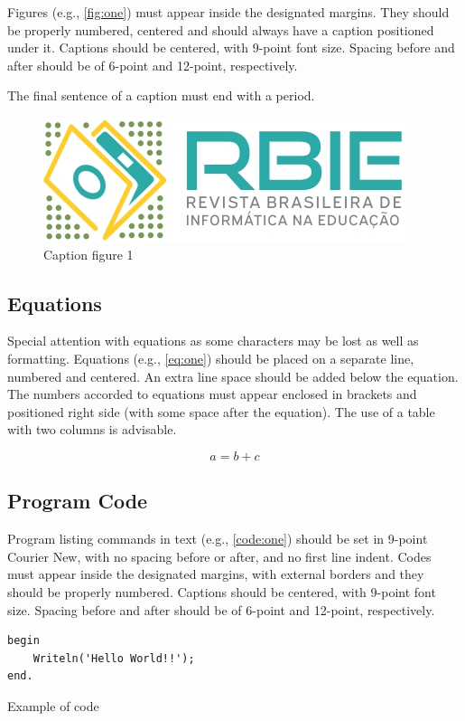 \documentclass[english, spanish, brazilian]{RBIEarticle} %
\begin{document}
Figures (e.g., \autoref{fig:one}) must appear inside the designated margins. They should be properly numbered, centered and should always have a caption positioned under it. Captions should be centered, with 9-point font size. Spacing before and after should be of 6-point and 12-point, respectively.

The final sentence of a caption must end with a period. 

\begin{figure}[h]
	\centerline{\includegraphics[scale=0.25]{newlogo.png}}
	\caption{Caption figure 1}
	\label{fig:one}
\end{figure}


\subsection{Equations}
Special attention with equations as some characters may be lost as well as formatting. Equations (e.g., \autoref{eq:one}) should be placed on a separate line, numbered and centered. An extra line space should be added below the equation. The numbers accorded to equations must appear enclosed in brackets and positioned right side (with some space after the equation).
The use of a table with two columns is advisable.

\begin{equation}
	a = b + c
	\label{eq:one}
\end{equation}


\subsection{Program Code}
Program listing commands in text (e.g., \autoref{code:one}) should be set in 9-point Courier New, with no spacing before or after, and no first line indent. Codes must appear inside the designated margins, with external borders and they should be properly numbered. Captions should be centered, with 9-point font size. Spacing before and after should be of 6-point and 12-point, respectively.

\begin{code}[h]
	\begin{lstlisting}
begin
    Writeln('Hello World!!');
end.
	\end{lstlisting}
	\caption{Example of code}
	\label{code:one}
\end{code}
\end{document}
